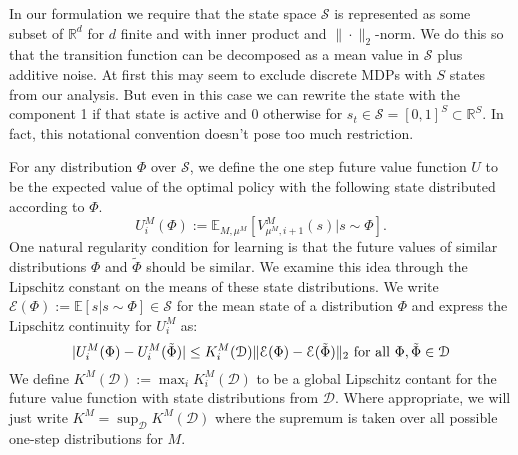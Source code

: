 \documentclass{article}
\newcommand{\Exp}{\mathds{E}}
\newcommand{\Real}{\mathds{R}}
\newcommand{\Sc}{\mathcal{S}}
\newcommand{\Ec}{\mathcal{E}}
\newcommand{\Dc}{\mathcal{D}}
\begin{document}
In our formulation we require that the state space $\Sc$ is represented as some subset of $\Real^d$ for $d$ finite and with inner product and $\| \cdot \|_2$-norm.
We do this so that the transition function can be decomposed as a mean value in $\Sc$ plus additive noise.
At first this may seem to exclude discrete MDPs with $S$ states from our analysis.
But even in this case we can rewrite the state with the component 1 if that state is active and 0 otherwise for $s_t \in \Sc = [0,1]^S \subset \Real^S$.
In fact, this notational convention doesn't pose too much restriction.

For any distribution $\Phi$ over $\Sc$, we define the one step future value function $U$ to be the expected value of the optimal policy with the following state distributed according to $\Phi$.
\begin{equation}
\label{eq: future value}
U^M_{i}(\Phi) := \Exp_{M,\mu^M}\left[ V^M_{\mu^M,i+1}(s) \big| s \sim \Phi \right].
\end{equation}
One natural regularity condition for learning is that the future values of similar distributions $\Phi$ and $\tilde{\Phi}$ should be similar.
We examine this idea through the Lipschitz constant on the means of these state distributions.
We write $\Ec(\Phi) := \Exp[s | s \sim \Phi] \in \Sc$ for the mean state of a distribution $\Phi$ and express the Lipschitz continuity for $U_i^M$ as:
\begin{equation}
\label{eq: future Lipschitz}
| U^M_i(\Phi) - U^M_i(\tilde{\Phi}) | \le K^M_i(\Dc) \| \Ec(\Phi) - \Ec(\tilde{\Phi}) \|_2 {\rm \ for \ all \ } \Phi, \tilde{\Phi} \in \Dc
\end{equation}
We define $K^M(\Dc) := \max_{i} K^M_i(\Dc)$ to be a global Lipschitz contant for the future value function with state distributions from $\Dc$.
Where appropriate, we will just write $K^M = \sup_\Dc K^M(\Dc)$ where the supremum is taken over all possible one-step distributions for $M$.
\end{document}
